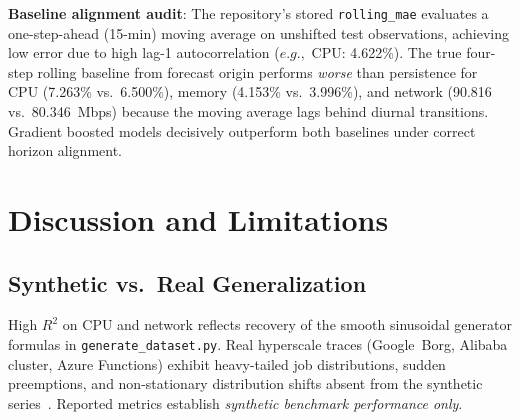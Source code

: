 \documentclass[conference]{IEEEtran}
\begin{document}
\textbf{Baseline alignment audit}: The repository's stored
\texttt{rolling\_mae} evaluates a one-step-ahead (15-min) moving average on
unshifted test observations, achieving low error due to high lag-1
autocorrelation ($e.g.,$ CPU: 4.622\%). The true four-step rolling baseline
from forecast origin performs \emph{worse} than persistence for CPU
(7.263\% vs.\ 6.500\%), memory (4.153\% vs.\ 3.996\%), and network
(90.816 vs.\ 80.346~Mbps) because the moving average lags behind diurnal
transitions. Gradient boosted models decisively outperform both baselines
under correct horizon alignment.

\section{Discussion and Limitations}

\subsection{Synthetic vs.\ Real Generalization}
High $R^2$ on CPU and network reflects recovery of the smooth sinusoidal
generator formulas in \texttt{generate\_dataset.py}. Real hyperscale traces
(Google~Borg, Alibaba cluster, Azure Functions) exhibit heavy-tailed job
distributions, sudden preemptions, and non-stationary distribution shifts
absent from the synthetic series~\cite{r3}. Reported metrics establish
\emph{synthetic benchmark performance only}.
\end{document}
